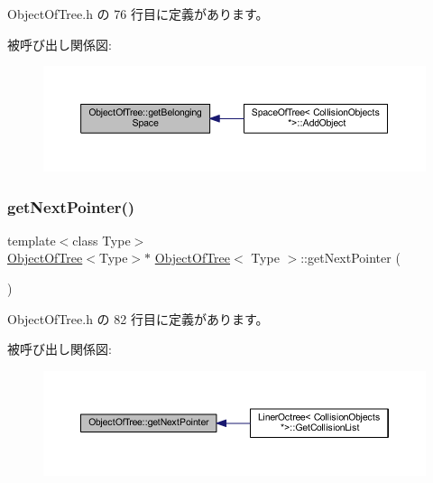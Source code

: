  Object\+Of\+Tree.\+h の 76 行目に定義があります。

被呼び出し関係図\+:\nopagebreak
\begin{figure}[H]
\begin{center}
\leavevmode
\includegraphics[width=350pt]{class_object_of_tree_a94c5724ddb841da0bb31ab6ae63df304_icgraph}
\end{center}
\end{figure}
\mbox{\label{class_object_of_tree_a596be7ee8c6e26a104bed5d26f7cf54e}} 
\subsubsection{\texorpdfstring{get\+Next\+Pointer()}{getNextPointer()}}
{\footnotesize\ttfamily template$<$class Type$>$ \\
\mbox{\hyperlink{class_object_of_tree}{Object\+Of\+Tree}}$<$Type$>$$\ast$ \mbox{\hyperlink{class_object_of_tree}{Object\+Of\+Tree}}$<$ Type $>$\+::get\+Next\+Pointer (\begin{DoxyParamCaption}{ }\end{DoxyParamCaption})\hspace{0.3cm}{\ttfamily [inline]}}



 Object\+Of\+Tree.\+h の 82 行目に定義があります。

被呼び出し関係図\+:\nopagebreak
\begin{figure}[H]
\begin{center}
\leavevmode
\includegraphics[width=350pt]{class_object_of_tree_a596be7ee8c6e26a104bed5d26f7cf54e_icgraph}
\end{center}
\end{figure}
\mbox{\label{class_object_of_tree_a1b5839c677aa3c678733c1aa03d4f00f}} 
